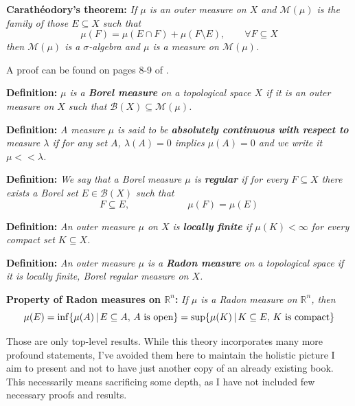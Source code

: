 \vspace{2ex}
\textbf{Carathéodory's theorem:} \textit{If $\mu$ is an outer measure on $X$ and $\mathcal
M(\mu)$ is the family of those $E\subseteq X$ such that
\[\mu(F)=\mu(E\cap F)+\mu(F\setminus E),\quad\quad\forall F\subseteq X\]
then $\mathcal M(\mu)$ is a $\sigma$-algebra and $\mu$ is a measure on $\mathcal
M(\mu)$.}

\vspace{2ex}
A proof can be found on pages 8-9 of \cite{maggi}.

\vspace{2ex}
\textbf{Definition:} \textit{$\mu$ is a \textbf{Borel measure} on a topological space $X$
if it is an outer measure on $X$ such that $\mathcal B(X)\subseteq\mathcal M(\mu)$.}

\vspace{2ex}
\textbf{Definition:} \textit{A measure $\mu$ is said to be \textbf{absolutely continuous
with respect to} measure $\lambda$ if for any set $A$, $\lambda(A)=0$
implies $\mu(A)=0$ and we write it $\mu << \lambda$.}

\vspace{2ex}
\textbf{Definition:} \textit{We say that a Borel measure $\mu$ is \textbf{regular} if
for every $F\subseteq X$ there exists a Borel set $E\in\mathcal B(X)$ such that
\[F\subseteq E,\quad\quad\quad\quad\quad\quad\mu(F)=\mu(E)\]}

\vspace{2ex}
\textbf{Definition:} \textit{An outer measure $\mu$ on $X$ is \textbf{locally finite} if
$\mu(K)<\infty$ for every compact set $K\subseteq X$.}

\vspace{2ex}
\textbf{Definition:} \textit{An outer measure $\mu$ is a \textbf{Radon measure} on a
topological space if it is locally finite, Borel regular measure on $X$.}

\vspace{2ex}
\textbf{Property of Radon measures on $\mathbb{R}^n$:} \textit{If $\mu$ is a Radon
measure on $\mathbb{R}^n$, then
\[
    \mu(E)=\inf\{\mu(A)\,|\,E\subseteq A,\,A\textnormal{ is open}\}
          =\sup\{\mu(K)\,|\,K\subseteq E,\,K\textnormal{ is compact}\}
\]}

\vspace{2ex}
Those are only top-level results. While this theory incorporates many more
profound statements, I've avoided them here to maintain the holistic picture I aim 
to present and not to have just another copy of an already existing book. This
necessarily means sacrificing some depth, as I have not included few necessary 
proofs and results.

